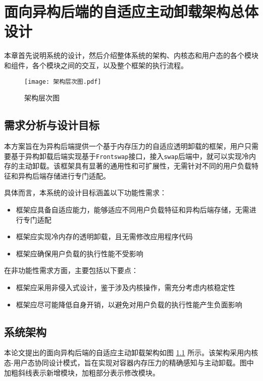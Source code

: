\chapter{面向异构后端的自适应主动卸载架构总体设计}

本章首先说明系统的设计，然后介绍整体系统的架构、内核态和用户态的各个模块和组件，各个模块之间的交互，以及整个框架的执行流程。

\begin{figure}[h]
    \centering
    \texttt{[image: 架构层次图.pdf]}
    \caption{架构层次图}
    \label{fig:system_architecture_hierarchy}
\end{figure}

\section{需求分析与设计目标}

本方案旨在为异构后端提供一个基于内存压力的自适应透明卸载的框架，用户只需要基于异构卸载后端实现基于\texttt{Frontswap}接口，接入\texttt{swap}后端中，就可以实现冷内存的主动卸载。该框架具有显著的通用性和可扩展性，无需针对不同的用户负载特征和异构后端存储进行专门适配。


具体而言，本系统的设计目标涵盖以下功能性需求：
\begin{itemize}
\item 框架应具备自适应能力，能够适应不同用户负载特征和异构后端存储，无需进行专门适配
\item 框架应实现冷内存的透明卸载，且无需修改应用程序代码
\item 框架应确保用户负载的执行性能不受影响
\end{itemize}

在非功能性需求方面，主要包括以下要点：
\begin{itemize}
\item 框架应采用非侵入式设计，鉴于涉及内核操作，需充分考虑内核稳定性
\item 框架应尽可能降低自身开销，以避免对用户负载的执行性能产生负面影响
\end{itemize}

\section{系统架构}
本论文提出的面向异构后端的自适应主动卸载架构如图 \ref{fig:system_architecture_hierarchy} 所示。该架构采用内核态-用户态协同设计模式，旨在实现对容器内存压力的精确感知与主动卸载。图中加粗斜线表示新增模块，加粗部分表示修改模块。

